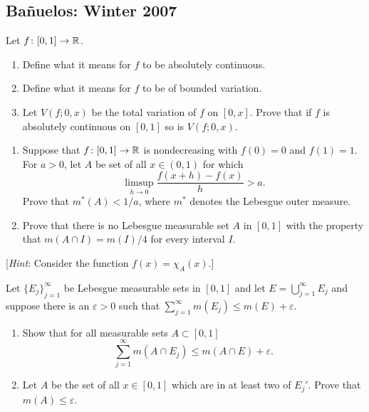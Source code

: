 \subsection{Bañuelos: Winter 2007}
\setcounter{exercise}{0}
\setcounter{equation}{0}
\begin{problem}
  Let $f\colon[0,1]\to\mathbb{R}$.
  \begin{enumerate}[label=(\roman*),noitemsep]
  \item Define what it means for $f$ to be absolutely continuous.
  \item Define what it means for $f$ to be of bounded variation.
  \item Let $V(f;0,x)$ be the total variation of $f$ on $[0,x]$. Prove that
    if $f$ is absolutely continuous on $[0,1]$ so is $V(f;0,x)$.
  \end{enumerate}
\end{problem}
\begin{solution}
\end{solution}

\begin{problem}
  \hfill
  \begin{enumerate}[label=(\roman*),noitemsep]
  \item Suppose that $f\colon[0,1]\to\mathbb{R}$ is nondecreasing with $f(0)=0$
    and $f(1)=1$. For $a>0$, let $A$ be set of all $x\in(0,1)$ for which
    \[
      \limsup_{h\to 0}\frac{f(x+h)-f(x)}{h}>a.
    \]
    Prove that $m^*(A)<1/a$, where $m^*$ denotes the Lebesgue outer
    measure.
  \item Prove that there is no Lebesgue measurable set $A$ in $[0,1]$ with
    the property that $m(A\cap I)=m(I)/4$ for every interval $I$.
  \end{enumerate}
  [\emph{Hint}: Consider the function $f(x)=\chi_A(x)$.]
\end{problem}
\begin{solution}
\end{solution}

\begin{problem}
  Let ${\{E_j\}}_{j=1}^\infty$ be Lebesgue measurable sets in $[0,1]$ and
  let $E=\bigcup_{j=1}^\infty E_j$ and suppose there is an $\varepsilon>0$
  such that $\sum_{j=1}^\infty m(E_j)\leq m(E)+\varepsilon$.
  \begin{enumerate}[label=(\roman*),noitemsep]
  \item Show that for all measurable sets $A\subset[0,1]$
    \[
      \sum_{j=1}^\infty m(A\cap E_j)\leq m(A\cap E)+\varepsilon.
    \]
  \item Let $A$ be the set of all $x\in[0,1]$ which are in at least two of
    $E_j'$. Prove that $m(A)\leq\varepsilon$.
  \end{enumerate}
\end{problem}
\begin{solution}
\end{solution}

